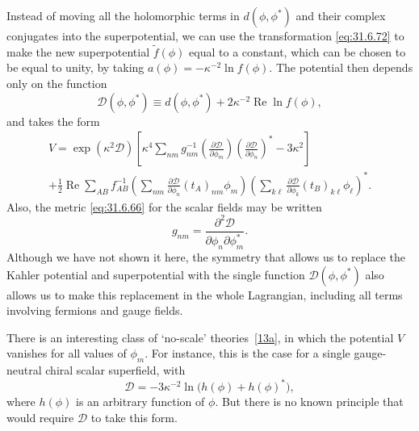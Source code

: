Instead of moving all the holomorphic terms in \(d(\phi,\phi^*)\) and
their complex conjugates into the superpotential, we can use the
transformation \eqref{eq:31.6.72} to make the new superpotential
\(\widetilde f(\phi)\) equal to a constant, which can be chosen to be
equal to unity, by taking
\(a(\phi)=-\kappa^{-2}\ln f(\phi)\). The potential then depends only on
the function
\begin{equation}
  \mathcal D(\phi,\phi^*)
  \equiv d(\phi,\phi^*)+2\kappa^{-2}\operatorname{Re}\ln f(\phi),
  \tag{31.6.76}\label{eq:31.6.76}
\end{equation}
and takes the form
\begin{multline}
  V
  =\exp(\kappa^2\mathcal D)\left[
    \kappa^4\sum_{nm}g^{-1}_{nm}
      \left(\frac{\partial\mathcal D}{\partial\phi_m}\right)
      \left(\frac{\partial\mathcal D}{\partial\phi_n}\right)^*
    -3\kappa^2
  \right]\\
  +\frac{1}{2}\operatorname{Re}\sum_{AB}f^{-1}_{AB}
    \left(
      \sum_{nm}\frac{\partial\mathcal D}{\partial\phi_n}
      (t_A)_{nm}\phi_m
    \right)
    \left(
      \sum_{k\ell}\frac{\partial\mathcal D}{\partial\phi_k}
      (t_B)_{k\ell}\phi_\ell
    \right)^*.
  \tag{31.6.77}\label{eq:31.6.77}
\end{multline}
Also, the metric \eqref{eq:31.6.66} for the scalar fields may be written
\begin{equation}
  g_{nm}
  =\frac{\partial^2\mathcal D}
         {\partial\phi_n\partial\phi_m^*}.
  \tag{31.6.78}\label{eq:31.6.78}
\end{equation}
Although we have not shown it here, the symmetry that allows us to
replace the Kahler potential and superpotential with the single
function \(\mathcal D(\phi,\phi^*)\) also allows us to make this
replacement in the whole Lagrangian, including all terms involving
fermions and gauge fields.

There is an interesting class of `no-scale'
theories~\hyperref[ch31-ref-13a]{[13a]}, in which the potential \(V\)
vanishes for all values of \(\phi_m\). For instance, this is the case
for a single gauge-neutral chiral scalar superfield, with
\begin{equation}
  \mathcal D
  =-3\kappa^{-2}\ln\bigl(h(\phi)+h(\phi)^*\bigr),
  \tag{31.6.79}\label{eq:31.6.79}
\end{equation}
where \(h(\phi)\) is an arbitrary function of \(\phi\). But there is no
known principle that would require \(\mathcal D\) to take this form.
